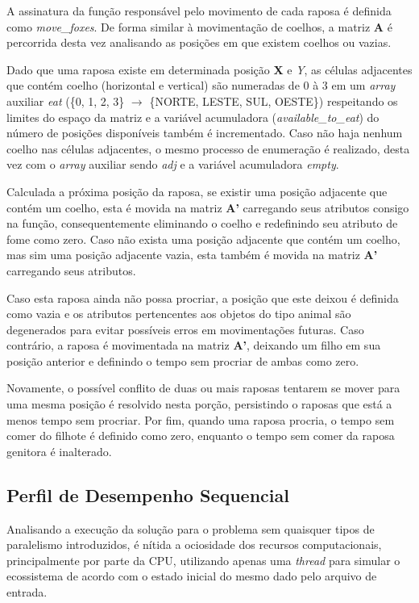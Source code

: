 \documentclass[a4paper, 12pt]{article}
\begin{document}
A assinatura da função responsável pelo movimento de cada raposa é definida como \emph{move\_foxes}. De forma similar à movimentação de coelhos, a matriz \textbf{A} é percorrida desta vez analisando as posições em que existem coelhos ou vazias. 

Dado que uma raposa existe em determinada posição \textbf{X} e \emph{Y}, as células adjacentes que contém coelho (horizontal e vertical) são numeradas de 0 à 3 em um \emph{array} auxiliar \emph{eat} (\{0, 1, 2, 3\} \(\rightarrow\) \{NORTE, LESTE, SUL, OESTE\}) respeitando os limites do espaço da matriz e a variável acumuladora (\emph{available\_to\_eat}) do número de posições disponíveis também é incrementado. Caso não haja nenhum coelho nas células adjacentes, o mesmo processo de enumeração é realizado, desta vez com o \emph{array} auxiliar sendo \emph{adj} e a variável acumuladora \emph{empty}.

Calculada a próxima posição da raposa, se existir uma posição adjacente que contém um coelho, esta é movida na matriz \textbf{A'} carregando seus atributos consigo na função, consequentemente eliminando o coelho e redefinindo seu atributo de fome como zero. Caso não exista uma posição adjacente que contém um coelho, mas sim uma posição adjacente vazia, esta também é movida na matriz \textbf{A'} carregando seus atributos.

Caso esta raposa ainda não possa procriar, a posição que este deixou é definida como vazia e os atributos pertencentes aos objetos do tipo animal são degenerados para evitar possíveis erros em movimentações futuras. Caso contrário, a raposa é movimentada na matriz \textbf{A'}, deixando um filho em sua posição anterior e definindo o tempo sem procriar de ambas como zero. 

Novamente, o possível conflito de duas ou mais raposas tentarem se mover para uma mesma posição é resolvido nesta porção, persistindo o raposas que está a menos tempo sem procriar. Por fim, quando uma raposa procria, o tempo sem comer do filhote é definido como zero, enquanto o tempo sem comer da raposa genitora é inalterado.

\subsection{Perfil de Desempenho Sequencial}

Analisando a execução da solução para o problema sem quaisquer tipos de paralelismo introduzidos, é nítida a ociosidade dos recursos computacionais, principalmente por parte da CPU, utilizando apenas uma \emph{thread} para simular o ecossistema de acordo com o estado inicial do mesmo dado pelo arquivo de entrada.
\end{document}
